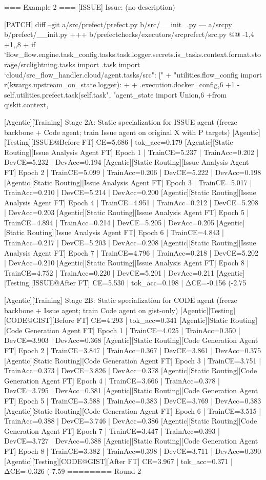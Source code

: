 === Example 2 ===
[ISSUE]
Issue: (no description)

[PATCH]
diff --git a/src/prefect/prefect.py b/src/__init_.py --- a/srcpy b/prefect/__init.py +++ b/prefectchecks/executors/srcprefect/src.py @@ -1,4 +1,,8 + if `flow_flow.engine.task_config.tasks.task.logger.secrets.is_tasks.context.format.storage/srclightning.tasks import .task import `cloud/src_flow_handler.cloud/agent.tasks/src": [" + "utilities.flow_config import r(kwargs.upstream_on_state.logger): + + .execution.docker_config,6 +1 - self.utilities.prefect.task(self.task", "agent_state import Union,6 +from qiskit.context,

[Agentic][Training] Stage 2A: Static specialization for ISSUE agent (freeze backbone + Code agent; train Issue agent on original X with P targets)
[Agentic][Testing][ISSUE@Before FT] CE=5.686 | tok_acc=0.179
[Agentic][Static Routing][Issue Analysis Agent FT] Epoch 1 | TrainCE=5.237 | TrainAcc=0.202 | DevCE=5.232 | DevAcc=0.194
[Agentic][Static Routing][Issue Analysis Agent FT] Epoch 2 | TrainCE=5.099 | TrainAcc=0.206 | DevCE=5.222 | DevAcc=0.198
[Agentic][Static Routing][Issue Analysis Agent FT] Epoch 3 | TrainCE=5.017 | TrainAcc=0.210 | DevCE=5.214 | DevAcc=0.200
[Agentic][Static Routing][Issue Analysis Agent FT] Epoch 4 | TrainCE=4.951 | TrainAcc=0.212 | DevCE=5.208 | DevAcc=0.203
[Agentic][Static Routing][Issue Analysis Agent FT] Epoch 5 | TrainCE=4.894 | TrainAcc=0.214 | DevCE=5.205 | DevAcc=0.205
[Agentic][Static Routing][Issue Analysis Agent FT] Epoch 6 | TrainCE=4.843 | TrainAcc=0.217 | DevCE=5.203 | DevAcc=0.208
[Agentic][Static Routing][Issue Analysis Agent FT] Epoch 7 | TrainCE=4.796 | TrainAcc=0.218 | DevCE=5.202 | DevAcc=0.210
[Agentic][Static Routing][Issue Analysis Agent FT] Epoch 8 | TrainCE=4.752 | TrainAcc=0.220 | DevCE=5.201 | DevAcc=0.211
[Agentic][Testing][ISSUE@After FT] CE=5.530 | tok_acc=0.198 | ΔCE=-0.156 (-2.75%

[Agentic][Training] Stage 2B: Static specialization for CODE agent (freeze backbone + Issue agent; train Code agent on gist-only)
[Agentic][Testing][CODE@GIST][Before FT] CE=4.293 | tok_acc=0.341
[Agentic][Static Routing][Code Generation Agent FT] Epoch 1 | TrainCE=4.025 | TrainAcc=0.350 | DevCE=3.903 | DevAcc=0.368
[Agentic][Static Routing][Code Generation Agent FT] Epoch 2 | TrainCE=3.847 | TrainAcc=0.367 | DevCE=3.861 | DevAcc=0.375
[Agentic][Static Routing][Code Generation Agent FT] Epoch 3 | TrainCE=3.751 | TrainAcc=0.373 | DevCE=3.826 | DevAcc=0.378
[Agentic][Static Routing][Code Generation Agent FT] Epoch 4 | TrainCE=3.666 | TrainAcc=0.378 | DevCE=3.795 | DevAcc=0.381
[Agentic][Static Routing][Code Generation Agent FT] Epoch 5 | TrainCE=3.588 | TrainAcc=0.383 | DevCE=3.769 | DevAcc=0.383
[Agentic][Static Routing][Code Generation Agent FT] Epoch 6 | TrainCE=3.515 | TrainAcc=0.388 | DevCE=3.746 | DevAcc=0.386
[Agentic][Static Routing][Code Generation Agent FT] Epoch 7 | TrainCE=3.447 | TrainAcc=0.393 | DevCE=3.727 | DevAcc=0.388
[Agentic][Static Routing][Code Generation Agent FT] Epoch 8 | TrainCE=3.382 | TrainAcc=0.398 | DevCE=3.711 | DevAcc=0.390
[Agentic][Testing][CODE@GIST][After FT] CE=3.967 | tok_acc=0.371 | ΔCE=-0.326 (-7.59%
========
 Round 2
 

